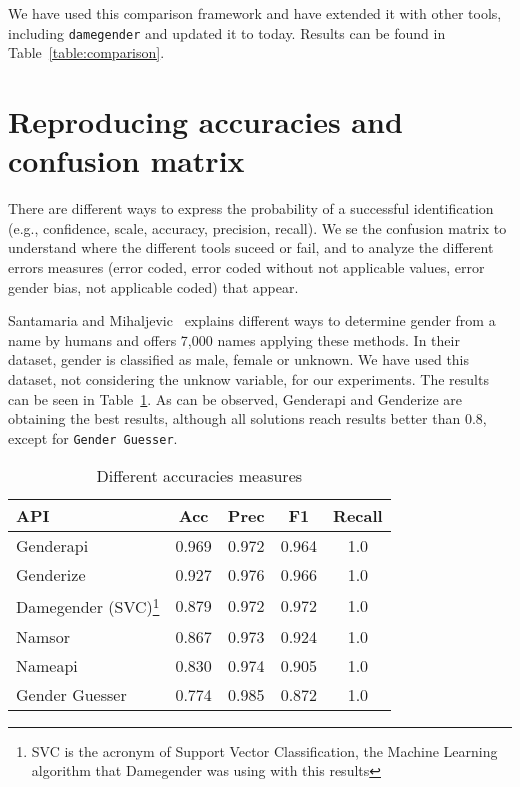 \documentclass[a4paper]{article}
\begin{document}
We have used this comparison framework and have extended it with other tools, including \texttt{damegender} and updated it to today.
Results can be found in Table~\ref{table:comparison}.

\section{Reproducing accuracies and confusion matrix}

There are different ways to express the probability of a successful identification (e.g., confidence, scale, accuracy, precision, recall).
We se the confusion matrix to understand where the different tools suceed or fail, and to analyze the different errors measures (error coded, error coded without not applicable values, error gender bias, not applicable coded) that appear.

Santamaria and Mihaljevic~\cite{10.7717/peerj-cs.156} explains different ways to determine gender from a name by humans and offers 7,000 names applying these methods. 
In their dataset, gender is classified as male, female or unknown. 
We have used this dataset, not considering the unknow variable, for our experiments.
The results can be seen in Table~\ref{table:DifferentAccuraciesMeasures}.
As can be observed, Genderapi and Genderize are obtaining the best results, although all solutions reach results better than 0.8, except for \texttt{Gender Guesser}.


\begin{table}
\footnotesize
\begin{tabular}[]{lcccc}
  \hline
  API & Acc & Prec & F1 & Recall\tabularnewline
\hline
Genderapi & 0.969 & 0.972 & 0.964 & 1.0\tabularnewline
Genderize & 0.927 & 0.976 & 0.966 & 1.0\tabularnewline
Damegender (SVC)\footnote{SVC is the acronym of Support Vector Classification, the Machine Learning algorithm that Damegender was using with this results} & 0.879 & 0.972 & 0.972 & 1.0\tabularnewline
Namsor & 0.867 & 0.973 & 0.924 & 1.0\tabularnewline
Nameapi & 0.830 & 0.974 & 0.905 & 1.0\tabularnewline
Gender Guesser & 0.774 & 0.985 & 0.872 & 1.0\tabularnewline
\hline
\end{tabular}
\caption{Different accuracies measures}
\label{table:DifferentAccuraciesMeasures}
\end{table}
\end{document}
